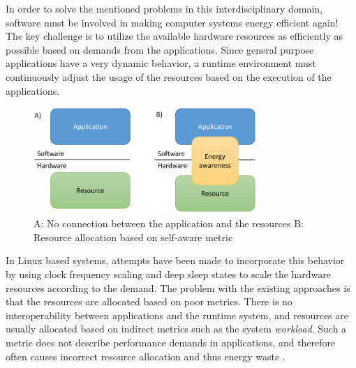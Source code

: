\documentclass{article}
\begin{document}
In order to solve the mentioned problems in this interdisciplinary domain, software must be involved in making computer systems energy efficient again!
The key challenge is to utilize the available hardware resources as efficiently as possible based on demands from the applications.
Since general purpose applications have a very dynamic behavior, a runtime environment must continuously adjust the usage of the resources based on the execution of the applications.
\begin{figure}
    \includegraphics[width=8.5cm]{fig/EAS_Overview.png}
  \caption{A: No connection between the application and the resources B: Resource allocation based on self-aware metric}
  \label{fig:EAS}
\end{figure}
In Linux based systems, attempts have been made to incorporate this behavior by using clock frequency scaling and deep sleep states to scale the hardware resources according to the demand. 
The problem with the existing approaches is that the resources are allocated based on poor metrics.
There is no interoperability between applications and the runtime system, and resources are usually allocated based on indirect metrics such as the system \textit{workload}.
Such a metric does not describe performance demands in applications, and therefore often causes incorrect resource allocation and thus energy waste \cite{HolmbackaDasip, HolmbackaHipeac}.
\smallskip
\end{document}
